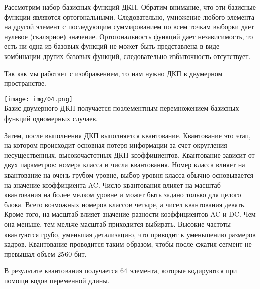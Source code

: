Рассмотрим набор базисных функций ДКП. Обратим внимание, что эти базисные функции являются ортогональными. Следовательно, умножение любого элемента на другой элемент с последующим суммированием по всем точкам выборки дает нулевое (скалярное) значение. Ортогональность функций дает независимость, то есть ни одна из базовых функций не может быть представлена в виде комбинации других базовых функций, следовательно избыточность отсутствует. 

Так как мы работает с изображением, то нам нужно ДКП в двумерном пространстве.  

\texttt{[image: img/04.png]}\\

Базис двумерного ДКП получается поэлементным перемножением базисных функций одномерных случаев.

Затем, после выполнения ДКП выполняется квантование. Квантование это этап, на котором происходит основная потеря информации за счет округления несущественных, высокочастотных ДКП-коэффициентов. Квантование зависит от двух параметров: номера класса и числа квантования. Номер класса влияет на квантование на очень грубом уровне, выбор уровня класса обычно основывается на значение коэффициента AC. Число квантования влияет на масштаб квантования на более мелком уровне и может быть задано только для целого блока. Всего возможных номеров классов четыре, а чисел квантования девять. Кроме того, на масштаб влияет значение разности коэффициентов AC и DC. Чем она меньше, тем мельче масштаб приходится выбирать. Высокие частоты квантуются грубо, уменьшая детализацию, что приводит к уменьшению размеров кадров. Квантование проводится таким образом, чтобы после сжатия сегмент не превышал объем 2560 бит.

В результате квантования получается 64 элемента, которые кодируются при помощи кодов переменной длины.

\pagebreak

